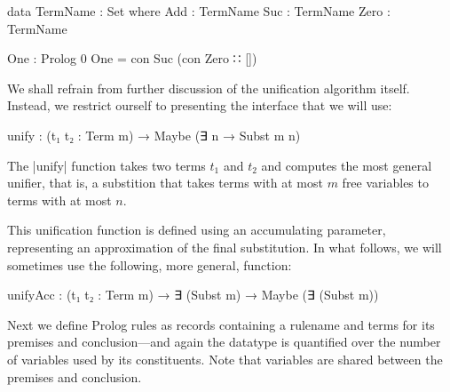 \documentclass[preprint]{sigplanconf}
\begin{document}
\begin{code}
data TermName : Set where
  Add   : TermName
  Suc   : TermName
  Zero  : TermName
\end{code}

\begin{code}
One : Prolog 0
One = con Suc (con Zero ∷ [])
\end{code}


We shall refrain from further discussion of the unification algorithm itself.
Instead, we restrict ourself to presenting the interface that we will use:
\begin{spec}
  unify : (t₁ t₂ : Term m) → Maybe (∃ n → Subst m n)
\end{spec}
The |unify| function takes two terms $t_1$ and $t_2$ and computes the most general
unifier, that is, a substition that takes terms with at most $m$ free
variables to terms with at most $n$.


This unification function is defined using an accumulating parameter,
representing an approximation of the final substitution. In what
follows, we will sometimes use the following, more general, function:
\begin{code}
  unifyAcc : (t₁ t₂ : Term m) →
    ∃ (Subst m) → Maybe (∃ (Subst m))
\end{code}

Next we define Prolog rules as records containing a rulename and terms for its
premises and conclusion---and again the datatype is quantified over the number of
variables used by its constituents. Note that variables are shared between the
premises and conclusion. 
\end{document}
